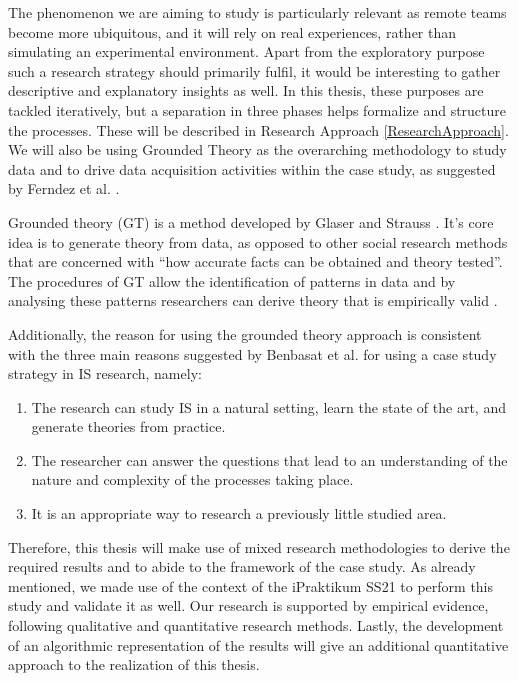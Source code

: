 The phenomenon we are aiming to study is particularly relevant as remote teams become more ubiquitous, and it will rely on real experiences, rather than simulating an experimental environment. Apart from the exploratory purpose such a research strategy should primarily fulfil, it would be interesting to gather descriptive and explanatory insights as well. In this thesis, these purposes are tackled iteratively, but a separation in three phases helps formalize and structure the processes. These will be described in Research Approach \ref{ResearchApproach}. We will also be using Grounded Theory as the overarching methodology to study data and to drive data acquisition activities within the case study, as suggested by Ferndez et al. \cite{Fernandez2004}. 

Grounded theory (GT) is a method developed by Glaser and Strauss \cite{Glaser1968}. It’s core idea is to generate theory from data, as opposed to other social research methods that are concerned with “how accurate facts can be obtained and theory tested”. The procedures of GT allow the identification of patterns in data and by analysing these patterns researchers can derive theory that is empirically valid \cite{Martin1986}.

Additionally, the reason for using the grounded theory approach is consistent with the three main reasons suggested by Benbasat et al. \cite{Benbasat1987} for using a case study strategy in IS research, namely:

\begin{enumerate}
    \item The research can study IS in a natural setting, learn the state of the art, and generate
theories from practice.
    \item The researcher can answer the questions that lead to an understanding of the nature
and complexity of the processes taking place.
    \item It is an appropriate way to research a previously little studied area.
\end{enumerate}

Therefore, this thesis will make use of mixed research methodologies to derive the required results and to abide to the framework of the case study. As already mentioned, we made use of the context of the iPraktikum SS21 to perform this study and validate it as well. Our research is supported by empirical evidence, following qualitative and quantitative research methods. Lastly, the development of an algorithmic representation of the results will give an additional quantitative approach to the realization of this thesis.

